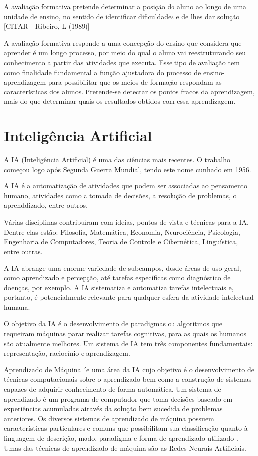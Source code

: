 \documentclass[
	12pt,				%
	openright,			%
	oneside,
	a4paper,			%
	english,			%
	french,				%
	spanish,			%
	brazil,				%
	]{abntex2}
\begin{document}
A avaliação formativa pretende determinar a posição do aluno ao longo de uma unidade de ensino, no sentido de identificar dificuldades e de lhes dar solução {\color{red} [CITAR - Ribeiro, L (1989)]}

A avaliação formativa responde a uma concepção do ensino que considera que aprender é um longo processo, por meio do qual o aluno vai reestruturando seu conhecimento a partir das atividades que executa. Esse tipo de avaliação tem como finalidade fundamental a função ajustadora do processo de ensino-aprendizagem para possibilitar que os meios de formação respondam as características dos alunos. Pretende-se detectar os pontos fracos da aprendizagem, mais do que determinar quais os resultados obtidos com essa aprendizagem. \cite{jorba2003funccao}

\section{Inteligência Artificial}
\label{sec:IA}
A IA (Inteligência Artificial) é uma das ciências mais recentes. O trabalho começou logo após Segunda Guerra Mundial, tendo este nome cunhado em 1956.\cite{russell2004inteligencia}

A IA é a automatização de atividades que podem ser associadas ao pensamento humano, atividades como a tomada de decisões, a resolução de problemas, o aprenddizado, entre outros. \cite{bellman1978introduction}

Várias disciplinas contribuíram com ideias, pontos de vista e técnicas para a IA. Dentre elas estão: Filosofia, Matemática, Economia, Neurociência, Psicologia, Engenharia de Computadores, Teoria de Controle e Cibernética, Linguística, entre outras. \cite{russell2004inteligencia}

A IA abrange uma enorme variedade de subcampos, desde áreas de uso geral, como aprendizado e percepção, até tarefas específicas como diagnóstico de doenças, por exemplo. A IA sistematiza e automatiza tarefas intelectuais e, portanto, é potencialmente relevante para qualquer esfera da atividade intelectual humana. \cite{russell2004inteligencia}

O objetivo da IA é o desenvolvimento de paradigmas ou algoritmos que requeiram máquinas parar realizar tarefas cognitivas, para as quais os humanos são atualmente melhores. Um sistema de IA tem três componentes fundamentais: representação, raciocínio e aprendizagem. \cite{sage1990concise}

Aprendizado de Máquina ´e uma área da IA cujo objetivo é o desenvolvimento de técnicas computacionais sobre o aprendizado bem como a construção de sistemas capazes de adquirir conhecimento de forma automática. Um sistema de aprendizado é um programa de computador que toma decisões baseado em experiências acumuladas através da solução bem sucedida de problemas anteriores. Os diversos sistemas de aprendizado de máquina possuem características particulares e comuns que possibilitam sua classificação quanto à linguagem de descrição, modo, paradigma e forma de aprendizado utilizado \cite{monard2003sistemas}.
Umas das técnicas de aprendizado de máquina são as Redes Neurais Artificiais.
\end{document}
